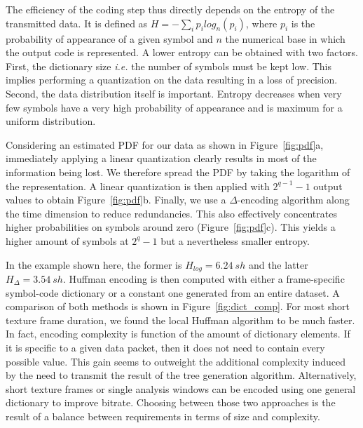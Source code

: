 \documentclass[final,3p,times,twocolumn]{elsarticle}
\newcommand{\fg}[1]{\textcolor{red}{ Felix: #1}}
\begin{document}
The efficiency of the coding step thus directly depends on the entropy of the transmitted data. It is defined as $H = -\sum\limits_i p_ilog_n(p_i)$, where $p_i$ is the probability of appearance of a given symbol and $n$ the numerical base in which the output code is represented. A lower entropy can be obtained with two factors. First, the dictionary size \textit{i.e.} the number of symbols must be kept low. This implies performing a quantization on the data resulting in a loss of precision. Second, the data distribution itself is important. Entropy decreases when very few symbols have a very high probability of appearance and is maximum for a uniform distribution.

Considering an estimated PDF for our data as shown in Figure~\ref{fig:pdf}a, immediately applying a linear quantization clearly results in most of the information being lost. We therefore spread the PDF by taking the logarithm of the representation. A linear quantization is then applied with $2^{q-1}-1$ output values to obtain Figure~\ref{fig:pdf}b. Finally, we use a $\Delta$-encoding algorithm along the time dimension to reduce redundancies. This also effectively concentrates higher probabilities on symbols around zero (Figure~\ref{fig:pdf}c). This yields a higher amount of symbols at $2^q-1$ but a nevertheless smaller entropy.

In the example shown here, the former is $H_{log} = 6.24~sh$ and the latter $H_{\Delta} = 3.54~sh$. Huffman encoding is then computed with either a frame-specific symbol-code dictionary or a constant one generated from an entire dataset. A comparison of both methods is shown in Figure~\ref{fig:dict_comp}. For most short texture frame duration, we found the local Huffman algorithm to be much faster. In fact, encoding complexity is function of the amount of dictionary elements. If it is specific to a given data packet, then it does not need to contain every possible value. This gain seems to outweight the additional complexity induced by the need to transmit the result of the tree generation algorithm. Alternatively, short texture frames or single analysis windows can be encoded using one general dictionary to improve bitrate. Choosing between those two approaches is the result of a balance between requirements in terms of size and complexity.\\
\end{document}
